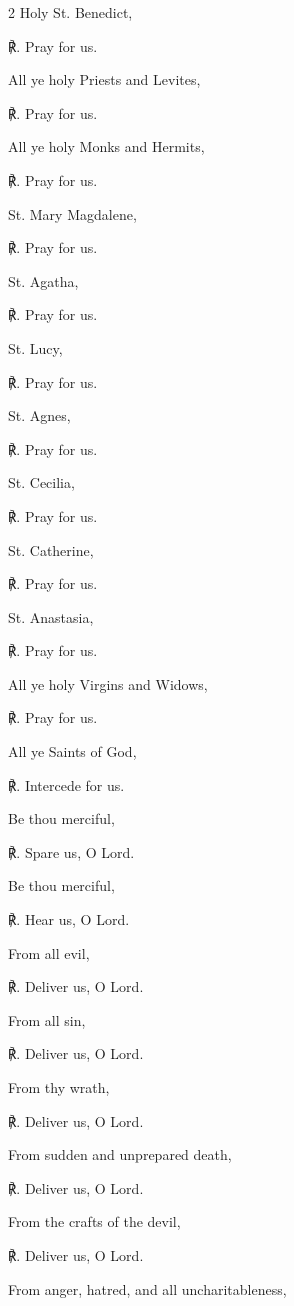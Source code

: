 \begin{multicols}{2}
Holy St. Benedict,\par
℟. Pray for us.\par\noindent
All ye holy Priests and Levites,\par
℟. Pray for us.\par\noindent
All ye holy Monks and Hermits,\par
℟. Pray for us.\par\noindent
St. Mary Magdalene,\par
℟. Pray for us.\par\noindent
St. Agatha,\par
℟. Pray for us.\par\noindent
St. Lucy,\par
℟. Pray for us.\par\noindent
St. Agnes,\par
℟. Pray for us.\par\noindent
St. Cecilia,\par
℟. Pray for us.\par\noindent
St. Catherine,\par
℟. Pray for us.\par\noindent
St. Anastasia,\par
℟. Pray for us.\par\noindent
All ye holy Virgins and Widows,\par
℟. Pray for us.\par\noindent
All ye Saints of God,\par
℟. Intercede for us.\par\noindent
Be thou merciful,\par
℟. Spare us, O Lord.\par\noindent
Be thou merciful,\par
℟. Hear us, O Lord.\par\noindent
From all evil,\par
℟. Deliver us, O Lord.\par\noindent
From all sin,\par
℟. Deliver us, O Lord.\par\noindent
From thy wrath,\par
℟. Deliver us, O Lord.\par\noindent
From sudden and unprepared death,\par
℟. Deliver us, O Lord.\par\noindent
From the crafts of the devil,\par
℟. Deliver us, O Lord.\par\noindent
From anger, hatred, and all uncharitableness,\par

\end{multicols}
